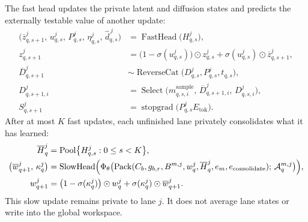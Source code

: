 \documentclass[10pt,a4paper]{article}
\newcommand{\op}[1]{\operatorname{#1}}
\newcommand{\stopgrad}{\operatorname{stopgrad}}
\newcommand{\Acal}{\mathcal{A}}
\begin{document}
The fast head updates the private latent and diffusion states and predicts the
externally testable value of another update:
\begin{align}
\bigl( \overline{z}^j_{q,s+1},\, u^j_{q,s},\, P^j_{q,s},\, \eta^j_{q,s},\,
  \widehat{d}^{\,j}_{q,s} \bigr) &= \op{FastHead}\bigl( H^j_{q,s} \bigr), \\
z^j_{q,s+1} &= \bigl( 1 - \sigma(u^j_{q,s}) \bigr) \odot z^j_{q,s}
  + \sigma(u^j_{q,s}) \odot \overline{z}^j_{q,s+1}, \\
\overline{D}^j_{q,s+1} &\sim \op{ReverseCat}\bigl( D^j_{q,s}, P^j_{q,s},
  t_{q,s} \bigr), \\
D^j_{q,s+1,i} &= \op{Select}\bigl( m^{\mathrm{sample}}_{q,s,i},\,
  \overline{D}^j_{q,s+1,i},\, D^j_{q,s,i} \bigr), \\
S^j_{q,s+1} &= \stopgrad\bigl( P^j_{q,s} E_{\mathrm{tok}} \bigr).
\label{eq:selfcond}
\end{align}
After at most $K$ fast updates, each unfinished lane privately consolidates
what it has learned:
\begin{align}
\overline{H}^j_q &= \op{Pool}\bigl\{ H^j_{q,s} : 0 \le s < K \bigr\}, \\
\bigl( \overline{w}^j_{q+1},\, \kappa^j_q \bigr) &=
  \op{SlowHead}\Bigl( \Phi_\theta\bigl( \op{Pack}( C_b, g_{b,r}, B^{m,j},
  w^j_q, \overline{H}^j_q, e_m, e_{\mathrm{consolidate}} );\,
  \Acal^{m,j}_q \bigr) \Bigr), \\
w^j_{q+1} &= \bigl( 1 - \sigma(\kappa^j_q) \bigr) \odot w^j_q
  + \sigma(\kappa^j_q) \odot \overline{w}^j_{q+1} .
\end{align}
This slow update remains private to lane $j$. It does not average lane states
or write into the global workspace.
\end{document}

